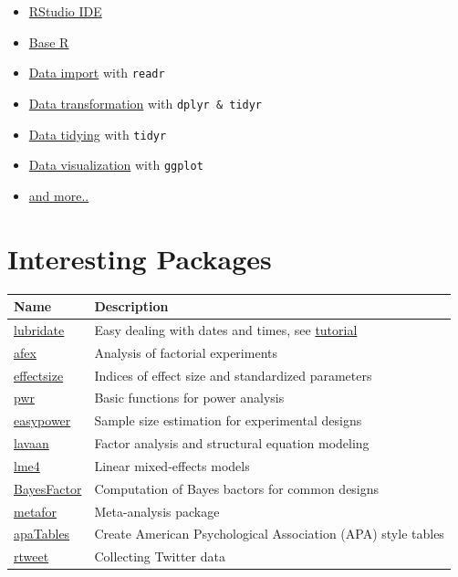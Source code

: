 \documentclass[
]{scrartcl}
\providecommand{\tightlist}{%
  \setlength{\itemsep}{0pt}\setlength{\parskip}{0pt}}
\begin{document}
\begin{itemize}
\tightlist
\item
  \href{https://raw.githubusercontent.com/rstudio/cheatsheets/main/rstudio-ide.pdf}{RStudio IDE}
\item
  \href{https://raw.githubusercontent.com/rstudio/cheatsheets/master/base-r.pdf}{Base R}
\item
  \href{https://raw.githubusercontent.com/rstudio/cheatsheets/main/data-import.pdf}{Data import} with \texttt{readr}
\item
  \href{https://raw.githubusercontent.com/rstudio/cheatsheets/main/data-transformation.pdf}{Data transformation} with \texttt{dplyr\ \&\ tidyr}
\item
  \href{https://raw.githubusercontent.com/rstudio/cheatsheets/master/tidyr.pdf}{Data tidying} with \texttt{tidyr}
\item
  \href{https://raw.githubusercontent.com/rstudio/cheatsheets/main/data-visualization.pdf}{Data visualization} with \texttt{ggplot}
\item
  \href{https://rstudio.com/resources/cheatsheets/}{and more..}
\end{itemize}

\hypertarget{packagelist}{%
\section{Interesting Packages}\label{packagelist}}

\begin{longtable}[]{@{}ll@{}}
\toprule
Name & Description\tabularnewline
\midrule
\endhead
\href{http://lubridate.tidyverse.org/}{lubridate} & Easy dealing with dates and times, see \href{https://r4ds.had.co.nz/dates-and-times.html}{tutorial}\tabularnewline
\href{https://cran.r-project.org/web/packages/afex/}{afex} & Analysis of factorial experiments\tabularnewline
\href{https://easystats.github.io/effectsize/}{effectsize} & Indices of effect size and standardized parameters\tabularnewline
\href{https://cran.r-project.org/web/packages/pwr/}{pwr} & Basic functions for power analysis\tabularnewline
\href{https://cran.r-project.org/web/packages/easypower}{easypower} & Sample size estimation for experimental designs\tabularnewline
\href{https://www.lavaan.ugent.be/}{lavaan} & Factor analysis and structural equation modeling\tabularnewline
\href{https://cran.r-project.org/web/packages/lme4/index.html}{lme4} & Linear mixed-effects models\tabularnewline
\href{https://richarddmorey.github.io/BayesFactor/}{BayesFactor} & Computation of Bayes bactors for common designs\tabularnewline
\href{http://www.metafor-project.org/}{metafor} & Meta-analysis package\tabularnewline
\href{https://cran.r-project.org/web/packages/apaTables/index.html}{apaTables} & Create American Psychological Association (APA) style tables\tabularnewline
\href{https://cran.r-project.org/web/packages/rtweet/index.html}{rtweet} & Collecting Twitter data\tabularnewline
\bottomrule
\end{longtable}
\end{document}
